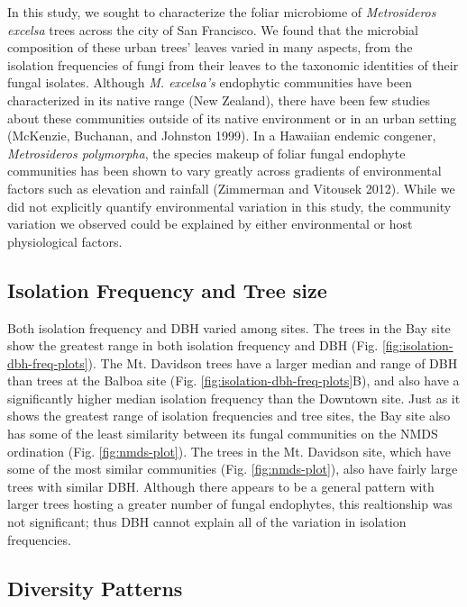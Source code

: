 \documentclass[fleqn,10pt,lineno]{wlpeerj} %
\begin{document}
In this study, we sought to characterize the foliar microbiome of \emph{Metrosideros excelsa} trees across the city of San Francisco. We found that the microbial composition of these urban trees' leaves varied in many aspects, from the isolation frequencies of fungi from their leaves to the taxonomic identities of their fungal isolates. Although \emph{M. excelsa's} endophytic communities have been characterized in its native range (New Zealand), there have been few studies about these communities outside of its native environment or in an urban setting (McKenzie, Buchanan, and Johnston 1999). In a Hawaiian endemic congener, \emph{Metrosideros polymorpha}, the species makeup of foliar fungal endophyte communities has been shown to vary greatly across gradients of environmental factors such as elevation and rainfall (Zimmerman and Vitousek 2012). While we did not explicitly quantify environmental variation in this study, the community variation we observed could be explained by either environmental or host physiological factors.

\hypertarget{isolation-frequency-and-tree-size}{%
\subsection*{Isolation Frequency and Tree size}\label{isolation-frequency-and-tree-size}}

Both isolation frequency and DBH varied among sites. The trees in the Bay site show the greatest range in both isolation frequency and DBH (Fig. \ref{fig:isolation-dbh-freq-plots}). The Mt. Davidson trees have a larger median and range of DBH than trees at the Balboa site (Fig. \ref{fig:isolation-dbh-freq-plots}B), and also have a significantly higher median isolation frequency than the Downtown site. Just as it shows the greatest range of isolation frequencies and tree sites, the Bay site also has some of the least similarity between its fungal communities on the NMDS ordination (Fig. \ref{fig:nmds-plot}). The trees in the Mt. Davidson site, which have some of the most similar communities (Fig. \ref{fig:nmds-plot}), also have fairly large trees with similar DBH. Although there appears to be a general pattern with larger trees hosting a greater number of fungal endophytes, this realtionship was not significant; thus DBH cannot explain all of the variation in isolation frequencies.

\hypertarget{diversity-patterns-1}{%
\subsection*{Diversity Patterns}\label{diversity-patterns-1}}
\end{document}
